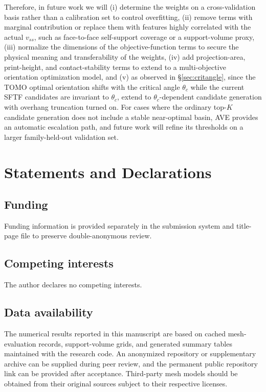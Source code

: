 \documentclass[11pt,a4paper]{article}
\begin{document}
Therefore, in future work we will (i) determine the weights on a cross-validation basis rather than a calibration set to control overfitting,
(ii) remove terms with marginal contribution or replace them with features highly correlated with the actual $v_{ss}$,
such as face-to-face self-support coverage or a support-volume proxy,
(iii) normalize the dimensions of the objective-function terms to secure the physical meaning and transferability of the weights,
(iv) add projection-area, print-height, and contact-stability terms to extend to a multi-objective orientation optimization model, and
(v) as observed in \S\ref{sec:critangle}, since the TOMO optimal orientation shifts with the critical angle $\theta_c$ while
the current SFTF candidates are invariant to $\theta_c$, extend to $\theta_c$-dependent candidate generation with overhang truncation turned on.
For cases where the ordinary top-$K$ candidate generation does not include a stable near-optimal basin,
AVE provides an automatic escalation path, and future work will refine its thresholds on a larger family-held-out validation set.

\section*{Statements and Declarations}

\subsection*{Funding}
Funding information is provided separately in the submission system and title-page file to preserve double-anonymous review.

\subsection*{Competing interests}
The author declares no competing interests.

\subsection*{Data availability}
The numerical results reported in this manuscript are based on cached mesh-evaluation records, support-volume grids, and generated summary tables maintained with the research code.
An anonymized repository or supplementary archive can be supplied during peer review, and the permanent public repository link can be provided after acceptance.
Third-party mesh models should be obtained from their original sources subject to their respective licenses.
\end{document}
